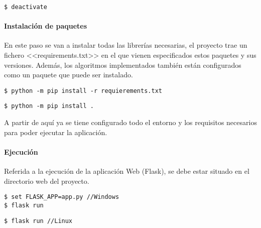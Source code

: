 \begin{tcolorbox}[colback=cyan!5!white,colframe=cyan!75!black,title=Para desactivar el entorno (una vez en él)]
\begin{verbatim}
$ deactivate
\end{verbatim}
\end{tcolorbox}

\paragraph{Instalación de paquetes} En este paso se van a instalar todas las
librerías necesarias, el proyecto trae un fichero <<requirements.txt>> en el que
vienen especificados estos paquetes y sus versiones. Además, los algoritmos
implementados también están configurados como un paquete que puede ser
instalado.

\begin{tcolorbox}[colback=cyan!5!white,colframe=orange!75!black,title=Instalar librerías externas]
\begin{verbatim}
$ python -m pip install -r requierements.txt
\end{verbatim}
\end{tcolorbox}

\begin{tcolorbox}[colback=cyan!5!white,colframe=orange!75!black,title=Instalar paquete de algoritmos]
\begin{verbatim}
$ python -m pip install .
\end{verbatim}
\end{tcolorbox}

A partir de aquí ya se tiene configurado todo el entorno y los requisitos necesarios para poder ejecutar la aplicación.

\paragraph{Ejecución} Referida a la ejecución de la aplicación Web (Flask), se
debe estar situado en el directorio web del proyecto.

\begin{tcolorbox}[colback=cyan!5!white,colframe=cyan!75!black,fontupper=\footnotesize,fontlower=\footnotesize,title=Ejecución Windows]
\begin{verbatim}
$ set FLASK_APP=app.py //Windows
$ flask run
\end{verbatim}
\tcblower
\begin{verbatim}
$ flask run //Linux
\end{verbatim}
\end{tcolorbox}

